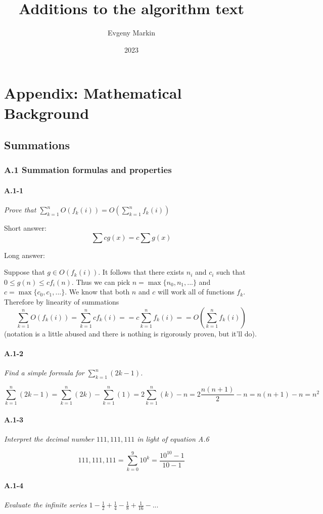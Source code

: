 \documentclass[11pt,oneside,titlepage]{book}
\title{Additions to the algorithm text}
\author{Evgeny Markin}
\date{2023}
\begin{document}
\part{Appendix: Mathematical Background}
\chapter{Summations}

\section*{A.1 Summation formulas and properties}

\subsection*{A.1-1}
\textit{Prove that $\sum_{k  = 1}^n{O(f_k(i))} = O(\sum_{k  = 1}^n{f_k(i)})$}

Short answer:
$$\sum cg(x) = c\sum{g(x)}$$

Long answer:

Suppose that $g \in O(f_k(i))$. It follows that there exists $n_i$ and $c_i$
such that $0 \leq g(n) \leq cf_i(n)$. Thus we can pick
$n = \max\{n_0, n_1, ...\}$ and $c = \max\{c_0, c_1, ... \}$. We know that
both $n$ and $c$ will work all of functions $f_k$. Therefore by
linearity of summations
$$\sum_{k  = 1}^n{O(f_k(i))}
= \sum_{k  = 1}^n{cf_k(i)} =
= c\sum_{k  = 1}^n{f_k(i)} = 
= O(\sum_{k  = 1}^n{f_k(i)})$$
(notation is a little abused and there is nothing is rigorously
proven, but it'll do).

\subsection*{A.1-2}
\textit{Find a simple formula for $\sum_{k = 1}^n{(2k - 1)}$.}

$$\sum_{k = 1}^n{(2k - 1)} =
\sum_{k = 1}^n{(2k)} - \sum_{k = 1}^n{(1)} =
2\sum_{k = 1}^n{(k)} - n =
2\frac{n(n + 1)}{2} - n =
n(n + 1) - n =
n^2
$$


\subsection*{A.1-3}
\textit{Interpret the decimal number $111,111,111$ in light of equation A.6}

$$111,111,111 = \sum_{k = 0}^{9}{10^k} = \frac{10^{10} - 1}{10 - 1}$$

\subsection*{A.1-4}
\textit{Evaluate the infinite series $1 - \frac 1 2 + \frac 1 4 - \frac 1 8
  + \frac{1}{16} - ...$}
\end{document}
